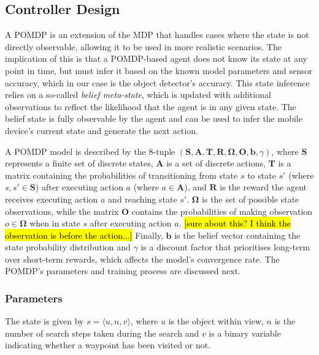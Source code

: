 \documentclass[runningheads]{llncs}
\DeclareRobustCommand{\tofix}[1]{{\sethlcolor{yellow}\hl{[#1]}}}
\begin{document}
\subsection{Controller Design}

A POMDP is an extension of the MDP that handles cases where the state is not directly observable, allowing it to be used in more realistic scenarios. 
The implication of this is that a POMDP-based agent does not know its state at any point in time, but must infer it based on the known model parameters and sensor accuracy, which in our case is the object detector's accuracy.
This state inference relies on a so-called {\em belief meta-state}, which is updated with additional observations to reflect the likelihood that the agent is in any given state.
The belief state is fully observable by the agent and can be used to infer the mobile device's current state and generate the next action.

A POMDP model is described by the 8-tuple $(\mathbf{S}, \mathbf{A}, \mathbf{T}, \mathbf{R}, \mathbf{\Omega}, \mathbf{O}, \mathbf{b}, \gamma)$, where $\mathbf{S}$ represents a finite set of discrete states, $\mathbf{A}$ is a set of discrete actions, $\mathbf{T}$ is a matrix containing the probabilities of transitioning from state $s$ to state $s'$ (where $s, s' \in \mathbf{S}$) after executing action $a$ (where $a \in \mathbf{A}$), and $\mathbf{R}$ is the reward the agent receives executing action $a$ and reaching state $s'$.
$\mathbf{\Omega}$ is the set of possible state observations, while the matrix $\mathbf{O}$ contains the probabilities of making observation $o \in \mathbf{\Omega}$ when in state $s$ after executing action $a$. \tofix{sure about this? I think the observation is before the action...}
Finally, $\mathbf{b}$ is the belief vector containing the state probability distribution and $\gamma$ is a discount factor that prioritises long-term over short-term rewards, which affects the model's convergence rate. 
The POMDP's parameters and training process are discussed next. 

\subsubsection{Parameters}

The state is given by $s = \langle u, n, v \rangle$, where $u$ is the object within view, $n$ is the number of search steps taken during the search and $v$ is a binary variable indicating whether a waypoint has been visited or not.
\end{document}
